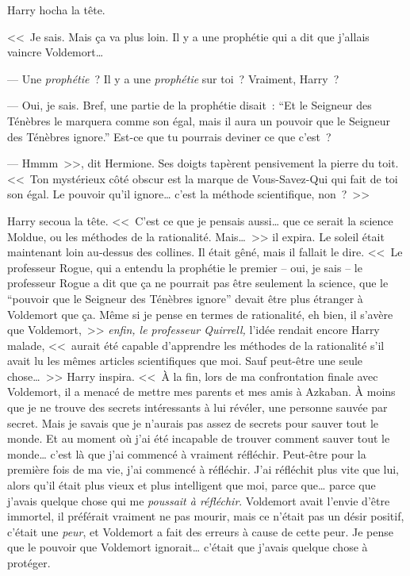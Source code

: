 Harry hocha la tête.

<<~Je sais. Mais ça va plus loin. Il y a une prophétie qui a dit que j'allais vaincre Voldemort…

--- Une \emph{prophétie}~? Il y a une \emph{prophétie} sur toi~? Vraiment, Harry~?

--- Oui, je sais. Bref, une partie de la prophétie disait~: “Et le Seigneur des Ténèbres le marquera comme son égal, mais il aura un pouvoir que le Seigneur des Ténèbres ignore.” Est-ce que tu pourrais deviner ce que c'est~?

--- Hmmm~>>, dit Hermione. Ses doigts tapèrent pensivement la pierre du toit. <<~Ton mystérieux côté obscur est la marque de Vous-Savez-Qui qui fait de toi son égal. Le pouvoir qu'il ignore… c'est la méthode scientifique, non~?~>>

Harry secoua la tête. <<~C'est ce que je pensais aussi… que ce serait la science Moldue, ou les méthodes de la rationalité. Mais…~>> il expira. Le soleil était maintenant loin au-dessus des collines. Il était gêné, mais il fallait le dire. <<~Le professeur Rogue, qui a entendu la prophétie le premier -- oui, je sais -- le professeur Rogue a dit que ça ne pourrait pas être seulement la science, que le “pouvoir que le Seigneur des Ténèbres ignore” devait être plus étranger à Voldemort que ça. Même si je pense en termes de rationalité, eh bien, il s'avère que Voldemort,~>> \emph{enfin, le professeur Quirrell,} l'idée rendait encore Harry malade, <<~aurait été capable d'apprendre les méthodes de la rationalité s'il avait lu les mêmes articles scientifiques que moi. Sauf peut-être une seule chose…~>> Harry inspira. <<~À la fin, lors de ma confrontation finale avec Voldemort, il a menacé de mettre mes parents et mes amis à Azkaban. À moins que je ne trouve des secrets intéressants à lui révéler, une personne sauvée par secret. Mais je savais que je n'aurais pas assez de secrets pour sauver tout le monde. Et au moment où j'ai été incapable de trouver comment sauver tout le monde… c'est là que j'ai commencé à vraiment réfléchir. Peut-être pour la première fois de ma vie, j'ai commencé à réfléchir. J'ai réfléchit plus vite que lui, alors qu'il était plus vieux et plus intelligent que moi, parce que… parce que j'avais quelque chose qui me \emph{poussait à réfléchir}. Voldemort avait l'envie d'être immortel, il préférait vraiment ne pas mourir, mais ce n'était pas un désir positif, c'était une \emph{peur}, et Voldemort a fait des erreurs à cause de cette peur. Je pense que le pouvoir que Voldemort ignorait… c'était que j'avais quelque chose à protéger.

